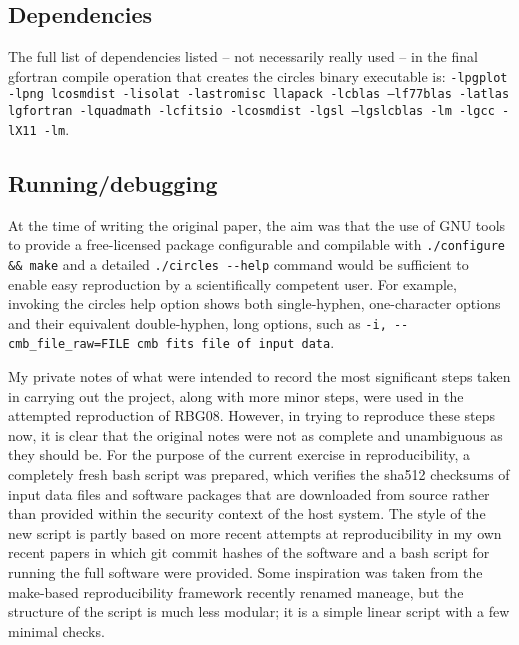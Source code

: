 \subsection{Dependencies}

The full list of dependencies listed -- not necessarily really used -- in
the final {\sc gfortran} compile operation that creates the {\sc circles}
binary executable is:
{\tt \mbox{\tt -lpgplot} -lpng lcosmdist -lisolat -lastromisc llapack -lcblas
--lf77blas -latlas lgfortran -lquadmath -lcfitsio -lcosmdist -lgsl
--lgslcblas -lm -lgcc -lX11 -lm}. \sloppy

\subsection{Running/debugging}

At the time of writing the original paper, the aim was that the use of GNU
tools to provide a free-licensed package configurable and compilable
with {\tt ./configure \&\& make} and a detailed {\tt ./circles
  -{}-help} command would be sufficient to enable easy reproduction by
a scientifically competent user. For example, invoking the {\sc
  circles} help option shows both single-hyphen, one-character options
and their equivalent double-hyphen, long options, such as
\mbox{{\tt -i,  -{}-cmb\_file\_raw=FILE cmb fits file of input data}}.
\sloppy

\fussy
My private notes of what were intended to record the most significant steps
taken in carrying out the project, along with more minor steps, were
used in the attempted reproduction of RBG08.  However, in trying to
reproduce these steps now, it is clear that the original notes were
not as complete and unambiguous as they should be.  For the purpose of
the current exercise in reproducibility, a completely fresh {\sc bash}
script was prepared, which verifies the sha512 checksums of input data
files and software packages that are downloaded from source rather
than provided within the security context of the host system. The
style of the new script is partly based on more recent attempts at
reproducibility in my own recent papers in which {\sc git} commit
hashes of the software\supercite{Roukema17silvir} and a {\sc bash}
script for running the full software\supercite{RO19flatness} were
provided. Some inspiration was taken from the {\sc make}-based reproducibility
framework\supercite{Akhlaghi15} recently renamed
{\sc maneage}\supercite{Akhlaghi2020}, but the structure of the
script is much less modular; it is a simple linear script with a
few minimal checks.

